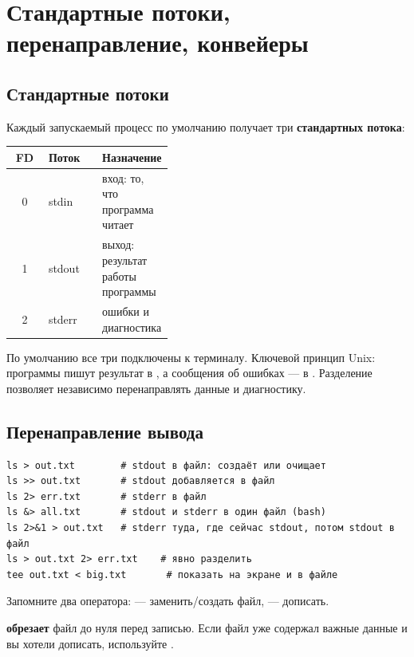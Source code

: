 \chapter{Стандартные потоки, перенаправление, конвейеры}
\label{ch:07-text-pipelines}

\section{Стандартные потоки}

Каждый запускаемый процесс по умолчанию получает три
\textbf{стандартных потока}:

\begin{center}
\begin{tabular}{clp{0.4\linewidth}}
\toprule
\textbf{FD} & \textbf{Поток} & \textbf{Назначение} \\
\midrule
0 & stdin  & вход: то, что программа читает \\
1 & stdout & выход: результат работы программы \\
2 & stderr & ошибки и диагностика \\
\bottomrule
\end{tabular}
\end{center}

По умолчанию все три подключены к терминалу. Ключевой принцип
Unix: программы пишут результат в , а сообщения
об ошибках --- в . Разделение позволяет
независимо перенаправлять данные и диагностику.

\section{Перенаправление вывода}

\begin{verbatim}
ls > out.txt        # stdout в файл: создаёт или очищает
ls >> out.txt       # stdout добавляется в файл
ls 2> err.txt       # stderr в файл
ls &> all.txt       # stdout и stderr в один файл (bash)
ls 2>&1 > out.txt   # stderr туда, где сейчас stdout, потом stdout в файл
ls > out.txt 2> err.txt    # явно разделить
tee out.txt < big.txt       # показать на экране и в файле
\end{verbatim}

Запомните два оператора: \cmd{>} --- заменить/создать файл,
\cmd{>>} --- дописать.

\begin{warnbox}
\cmd{>} \textbf{обрезает} файл до нуля перед записью. Если
файл уже содержал важные данные и вы хотели дописать,
используйте \cmd{>>}.
\end{warnbox}

